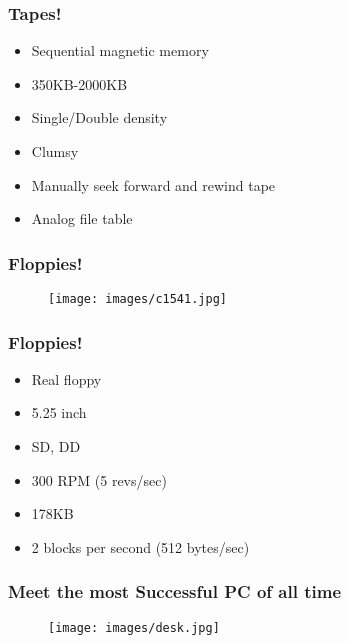 \documentclass[aspectratio=43]{uva-inf-presentation}
\begin{document}
\begin{frame}
\frametitle{Tapes!}

\begin{itemize}
\item Sequential magnetic memory
\item 350KB-2000KB
\item Single/Double density
\item Clumsy
\item Manually seek forward and rewind tape
\item Analog file table
\end{itemize}

\end{frame}


\begin{frame}
\frametitle{Floppies!}

\begin{figure}
\texttt{[image: images/c1541.jpg]}
\end{figure}

\end{frame}


\begin{frame}
\frametitle{Floppies!}

\begin{itemize}
\item Real floppy
\item 5.25 inch
\item SD, DD
\item 300 RPM (5 revs/sec)
\item 178KB
\item 2 blocks per second (512 bytes/sec)
\end{itemize}

\end{frame}


\begin{frame}
\frametitle{Meet the most Successful PC of all time}

\begin{figure}
\texttt{[image: images/desk.jpg]}
\end{figure}

\end{frame}
\end{document}
